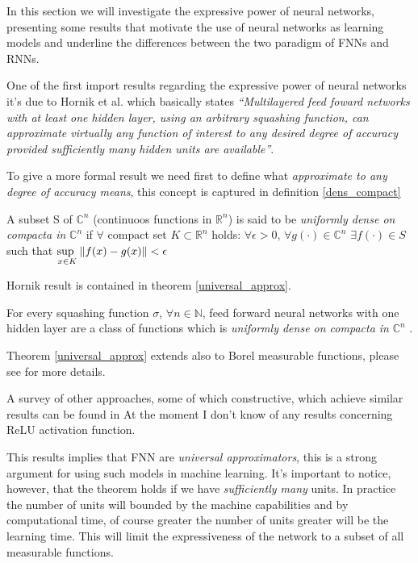 In this section we will investigate the expressive power of neural networks, presenting some results that motivate the use of neural networks as learning
models and underline the differences between the two paradigm of FNNs and RNNs. 

One of the first import results regarding the expressive power of neural networks it's due to Hornik et al. \cite{Hornik89} which basically states
\textit{``Multilayered feed foward networks with at least one hidden layer, using an arbitrary squashing function, can approximate virtually any function
of interest to any desired degree of accuracy provided sufficiently many hidden units are available''}.

To give a more formal result we need first to define what \textit{approximate to any degree of accuracy means}, this concept is captured in definition
\ref{dens_compact}
 
\begin{defn}
 A subset S of $\mathbb{C}^n$ (continuoos functions in $\mathbb{R}^n$) is said to be \textit{uniformly dense on compacta in} $\mathbb{C}^n$ if $\forall$
 compact set $K\subset \mathbb{R}^n$ holds: $\forall \epsilon >0$, $\forall g(\cdot) \in \mathbb{C}^n$ $\exists f(\cdot) \in S$ such that 
 $\underset{x \in K}{\text{sup  }} \left\Vert f(x)-g(x) \right\Vert<\epsilon$ 
 \label{dens_compact}
\end{defn}

Hornik result is contained in theorem \ref{universal_approx}.
\begin{thm}
 For every squashing function $\sigma$, $\forall n\in \mathbb{N}$, feed forward neural
 networks with one hidden layer are a class of functions which is \textit{uniformly dense on compacta in} $\mathbb{C}^n$
\label{universal_approx}.
\end{thm}

Theorem \ref{universal_approx} extends also to Borel measurable functions, please see \cite{Hornik89} for more details.

A survey of other approaches, some of which constructive, which achieve similar results can be found in \cite{Scarselli98}
At the moment I don't know of any results concerning ReLU activation function.

This results implies that FNN are \textit{universal approximators}, this is a strong argument for using such models in machine learning.
It's important to notice, however, that the theorem holds if we have \textit{sufficiently many} units. In practice the number of units will bounded
by the machine capabilities and by computational time, of course greater the number of units greater will be the learning time. This will limit
the expressiveness of the network to a subset of all measurable functions. 

